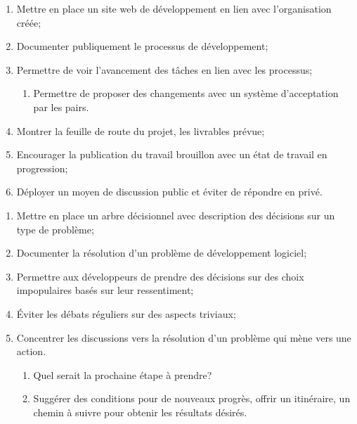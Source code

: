  \label{annexe_guide_dev_public}

\begin{enumerate}
    \item Mettre en place un site web de développement en lien avec l'organisation créée;
    \item Documenter publiquement le processus de développement;
    \item Permettre de voir l'avancement des tâches en lien avec les processus;
    \begin{enumerate}
        \item Permettre de proposer des changements avec un système d'acceptation par les pairs.
    \end{enumerate}
    \item Montrer la feuille de route du projet, les livrables prévue;
    \item Encourager la publication du travail brouillon avec un état de travail en progression;
    \item Déployer un moyen de discussion public et éviter de répondre en privé.
\end{enumerate}

 \label{annexe_guide_resolution_probleme}

\begin{enumerate}
    \item Mettre en place un arbre décisionnel avec description des décisions sur un type de problème;
    \item Documenter la résolution d'un problème de développement logiciel;
    \item Permettre aux développeurs de prendre des décisions sur des choix impopulaires basés sur leur ressentiment;
    \item Éviter les débats réguliers sur des aspects triviaux;
    \item Concentrer les discussions vers la résolution d'un problème qui mène vers une action.
    \begin{enumerate}
        \item Quel serait la prochaine étape à prendre?
        \item Suggérer des conditions pour de nouveaux progrès, offrir un itinéraire, un chemin à suivre pour obtenir les résultats désirés.
    \end{enumerate}
\end{enumerate}

 \label{annexe_guide_documentation}

